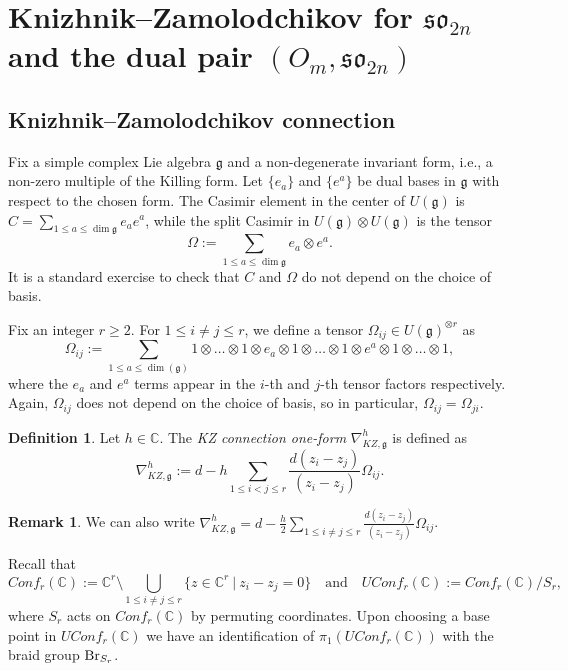 \documentclass[10pt]{amsart}
\numberwithin{equation}{section}
\theoremstyle{definition}
\newtheorem{remark}[theorem]{Remark}
\newtheorem{definition}[theorem]{Definition}
\def\C{{\mathbb C}}
\newcommand{\son}[1][2n]{\mathfrak{so}_{#1}}
\newcommand{\g}{\mathfrak{g}}
\begin{document}
\section{Knizhnik–Zamolodchikov for $\son$ and the dual pair $(O_m, \son)$}\label{sec3}
%

\subsection{Knizhnik–Zamolodchikov connection}
Fix a simple complex Lie algebra $\g$ and a non-degenerate invariant form, i.e., a non-zero multiple of the Killing form. Let $\{e_a\}$ and $\{e^a\}$ be dual bases in $\g$ with respect to the chosen form. The Casimir element in the center of $U(\g)$ is $C = \sum_{1\le a \le \dim \g} e_ae^a$, while the split Casimir in $ U(\g)\otimes U(\g)$ is the tensor 
\[
\Omega:= \sum_{1\le a\le \dim \g}e_a\otimes e^a. 
\]
It is a standard exercise to check that $C$ and $\Omega$ do not depend on the choice of basis.

Fix an integer $r\ge 2$. For $1\le i\ne j \le r$, we define a tensor $\Omega_{ij}\in U(\g)^{\otimes r}$ as 
\[
    \Omega_{ij}:=\sum_{1\le a\le \dim(\g)}1\otimes \dots \otimes 1\otimes e_a \otimes 1 \otimes \dots \otimes 1\otimes e^{a} \otimes 1 \otimes \dots \otimes 1,
\]
where the $e_a$ and $e^a$ terms appear in the $i$-th and $j$-th tensor factors respectively. Again, $\Omega_{ij}$ does not depend on the choice of basis, so in particular, $\Omega_{ij}= \Omega_{ji}$.  

\begin{definition}
Let $h\in \C$. The \emph{KZ connection one-form} $\nabla_{KZ, \g}^{h}$ is defined as
\begin{equation}\label{KZ_defn}
    \nabla_{KZ, \g}^{h}:=d-h \sum_{1\le i<j \le r} \frac{d(z_i-z_j)}{(z_i-z_j)}\Omega_{ij}. 
\end{equation}
\end{definition}

\begin{remark}
    We can also write $\nabla_{KZ, \g}^{h} = d-\frac{h}{2}\sum_{1\le i\ne j\le r}\frac{d(z_i-z_j)}{(z_i-z_j)}\Omega_{ij}$.
\end{remark}

Recall that
\[
Conf_r(\C):=
    \mathbb{C}^r \setminus \bigcup_{1\le i\ne j\le r} \{z \in \mathbb{C}^r \ | \ z_i-z_j=0\}
\quad \text{and} \quad
UConf_r(\C):=Conf_r(\C)/ S_r,
\]
where $S_r$ acts on $Conf_r(\C)$ by permuting coordinates. Upon choosing a base point in $UConf_r(\C)$ we have an identification of $\pi_1(UConf_r(\C))$ with the braid group ${\rm Br}_{ S_r}$. 
\end{document}
